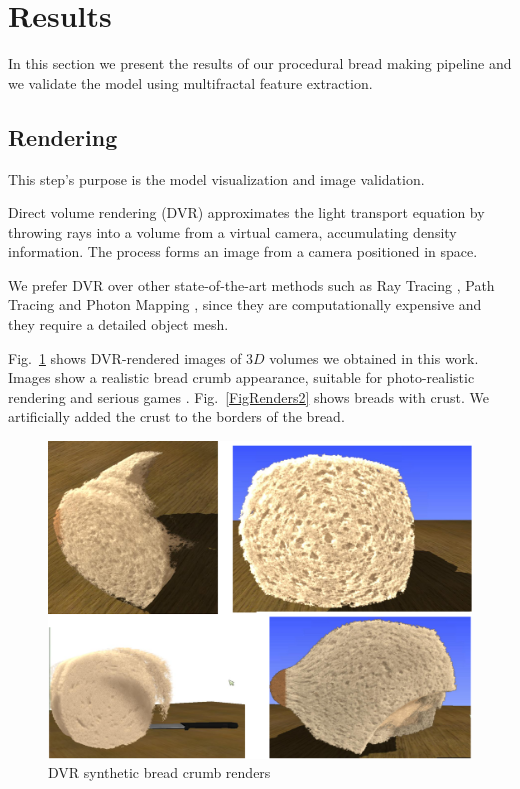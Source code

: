 \documentclass[final,5p,times]{elsarticle}
\begin{document}
{%
\section{Results}
In this section we present the results of our procedural bread making pipeline and we validate the model using multifractal feature extraction.

\subsection{Rendering}
This step's purpose is the model visualization and image validation.

Direct volume rendering (DVR) \cite{Kruger2003,Levoy1988, Max1995} approximates the light transport equation by throwing rays into a volume from a virtual camera, accumulating density information. The process forms an image from a camera positioned in space.

We prefer DVR over other state-of-the-art methods such as Ray Tracing \cite{Whitted1980,Singh2010}, Path Tracing \cite{Lafortune1993} and Photon Mapping \cite{Jensen1996}, since they are computationally expensive and they require a detailed object mesh.

Fig.~\ref{FigRenders} shows DVR-rendered images  of $3D$ volumes we obtained in this work. Images show a realistic bread crumb appearance, suitable for photo-realistic rendering and serious games \cite{Susi2007}. Fig.~\ref{FigRenders2} shows breads with crust. We artificially added the crust to the borders of the bread.

\begin{figure}[!ht]
\includegraphics[scale=0.15]{render2.png}
\caption{DVR synthetic bread crumb renders}
\label{FigRenders}
\end{figure}

}
\end{document}
